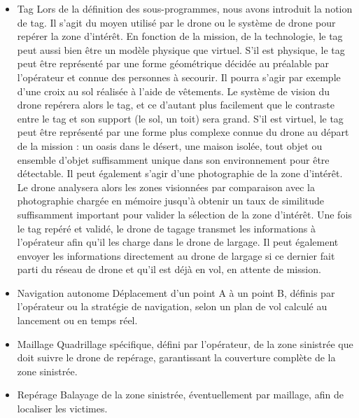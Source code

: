 \begin{itemize}
  \item Tag\newline
Lors de la définition des sous-programmes, nous avons introduit la notion
de tag. Il s'agit du moyen utilisé par le drone ou le système de drone pour
repérer la zone d'intérêt. En fonction de la mission, de la technologie, le
tag peut aussi bien être un modèle physique que virtuel.\newline
S'il est physique, le tag peut être représenté par une forme géométrique
décidée au préalable par l'opérateur et connue des personnes à secourir. Il
pourra s'agir par exemple d'une croix au sol réalisée à l'aide de
vêtements. Le système de vision du drone repérera alors le tag, et ce
d'autant plus facilement que le contraste entre le tag et son support (le
sol, un toit) sera grand.\newline
S'il est virtuel, le tag peut être représenté par une forme plus complexe
connue du drone au départ de la mission : un oasis dans le désert, une
maison isolée, tout objet ou ensemble d'objet suffisamment unique dans son
environnement pour être détectable. Il peut également s'agir d'une
photographie de la zone d'intérêt. Le drone analysera alors les zones
visionnées par comparaison avec la photographie chargée en mémoire jusqu'à
obtenir un taux de similitude suffisamment important pour valider la
sélection de la zone d'intérêt.\newline
Une fois le tag repéré et validé, le drone de tagage transmet les
informations à l'opérateur afin qu'il les charge dans le drone de largage.
Il peut également envoyer les informations directement au drone de largage
si ce dernier fait parti du réseau de drone et qu'il est déjà en vol, en
attente de mission.\newline

\item Navigation autonome\newline
Déplacement d’un point A à un point B, définis par l’opérateur ou la
stratégie de navigation, selon un plan de vol calculé au lancement ou en
temps réel.\newline

\item Maillage\newline
Quadrillage spécifique, défini par l’opérateur, de la zone sinistrée que
doit suivre le drone de repérage, garantissant la couverture complète de la
zone sinistrée.\newline

\item Repérage\newline
Balayage de la zone sinistrée, éventuellement par maillage, afin de
localiser les victimes.\newline


\end{itemize}
